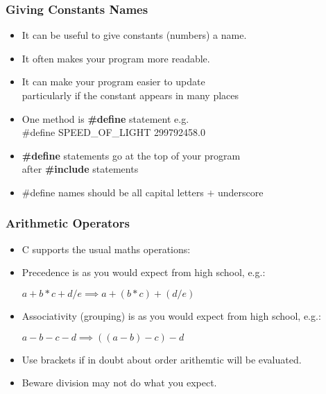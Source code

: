 \begin{frame}
\frametitle{Giving Constants Names}

\begin{itemize}
\item

It can be useful to give constants (numbers) a name.

\item

It often makes your program more readable.

\item

It can make your program easier to update \\
particularly if the constant appears in many places

\item

One method is {\bf \#define} statement e.g.\\
\#define SPEED\_OF\_LIGHT 299792458.0

\item
{\bf \#define} statements go at the top of your program \\
after {\bf \#include} statements

\item
\#define names should be all capital letters $+$ underscore

\end{itemize}
\end{frame}


\begin{frame}
\frametitle{Arithmetic Operators}

\begin{itemize}
\item

C supports the usual maths operations: \scalebox{1.2}{$ + - *$ $/$} 

\item

Precedence is as you would expect from high school, e.g.: 

$ a + b * c + d / e \implies a + (b * c) + (d / e)$

\item

Associativity (grouping) is as you would expect from high school, e.g.:

$ a - b - c - d \implies ((a - b) - c) - d $

\item

Use brackets if in doubt about order arithemtic will  be evaluated.

\item

Beware division may not do what you expect.

\end{itemize}
\end{frame}


